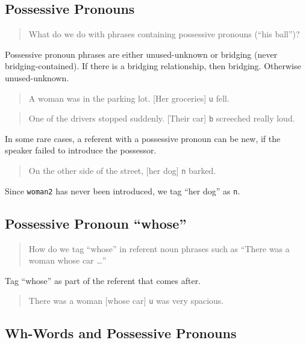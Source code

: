 \documentclass[
]{book}
\begin{document}
\hypertarget{possessive-pronouns}{%
\subsection{Possessive Pronouns}\label{possessive-pronouns}}

\begin{quote}
What do we do with phrases containing possessive pronouns (``his ball'')?
\end{quote}

Possessive pronoun phrases are either unused-unknown or bridging (never bridging-contained).
If there is a bridging relationship, then bridging. Otherwise unused-unknown.

\begin{quote}
A woman was in the parking lot.
{[}Her groceries{]} \texttt{u} fell.
\end{quote}

\begin{quote}
One of the drivers stopped suddenly.
{[}Their car{]} \texttt{b} screeched really loud.
\end{quote}

In some rare cases, a referent with a possessive pronoun can be new,
if the speaker failed to introduce the possessor.

\begin{quote}
On the other side of the street, {[}her dog{]} \texttt{n} barked.
\end{quote}

Since \texttt{woman2} has never been introduced, we tag ``her dog'' as \texttt{n}.

\hypertarget{possessive-pronoun-whose}{%
\subsection{Possessive Pronoun ``whose''}\label{possessive-pronoun-whose}}

\begin{quote}
How do we tag ``whose'' in referent noun phrases such as ``There was a woman whose car \ldots{}''
\end{quote}

Tag ``whose'' as part of the referent that comes after.

\begin{quote}
There was a woman {[}whose car{]} \texttt{u} was very spacious.
\end{quote}

\hypertarget{wh-words-and-possessive-pronouns}{%
\subsection{Wh-Words and Possessive Pronouns}\label{wh-words-and-possessive-pronouns}}
\end{document}

